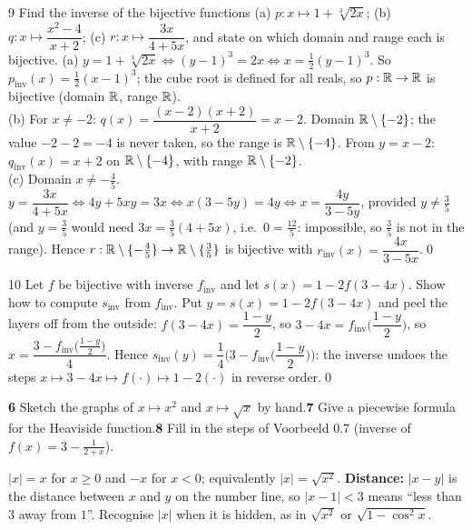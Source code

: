 \begin{bookex}{9}
Find the inverse of the bijective functions (a) $p:x\mapsto1+\sqrt[3]{2x}$; (b) $q:x\mapsto\dfrac{x^2-4}{x+2}$; (c) $r:x\mapsto\dfrac{3x}{4+5x}$, and state on which domain and range each is bijective.
\solution
(a) $y=1+\sqrt[3]{2x}\Leftrightarrow(y-1)^3=2x\Leftrightarrow x=\tfrac12(y-1)^3$. So $p_{\mathrm{inv}}(x)=\tfrac12(x-1)^3$; the cube root is defined for all reals, so $p:\mathbb{R}\to\mathbb{R}$ is bijective (domain $\mathbb{R}$, range $\mathbb{R}$).\\
(b) For $x\ne-2$: $q(x)=\dfrac{(x-2)(x+2)}{x+2}=x-2$. Domain $\mathbb{R}\setminus\{-2\}$; the value $-2-2=-4$ is never taken, so the range is $\mathbb{R}\setminus\{-4\}$. From $y=x-2$: $q_{\mathrm{inv}}(x)=x+2$ on $\mathbb{R}\setminus\{-4\}$, with range $\mathbb{R}\setminus\{-2\}$.\\
(c) Domain $x\ne-\frac45$. $y=\dfrac{3x}{4+5x}\Leftrightarrow4y+5xy=3x\Leftrightarrow x(3-5y)=4y\Leftrightarrow x=\dfrac{4y}{3-5y}$, provided $y\ne\frac35$ (and $y=\frac35$ would need $3x=\frac35(4+5x)$, i.e.\ $0=\frac{12}5$: impossible, so $\frac35$ is not in the range). Hence $r:\mathbb{R}\setminus\{-\frac45\}\to\mathbb{R}\setminus\{\frac35\}$ is bijective with $r_{\mathrm{inv}}(x)=\dfrac{4x}{3-5x}$.\qed
\end{bookex}

\begin{bookex}{10}
Let $f$ be bijective with inverse $f_{\mathrm{inv}}$ and let $s(x)=1-2f(3-4x)$. Show how to compute $s_{\mathrm{inv}}$ from $f_{\mathrm{inv}}$.
\solution
Put $y=s(x)=1-2f(3-4x)$ and peel the layers off from the outside: $f(3-4x)=\dfrac{1-y}2$, so $3-4x=f_{\mathrm{inv}}\!\Big(\dfrac{1-y}2\Big)$, so $x=\dfrac{3-f_{\mathrm{inv}}\big(\frac{1-y}2\big)}4$. Hence $s_{\mathrm{inv}}(y)=\dfrac14\Big(3-f_{\mathrm{inv}}\Big(\dfrac{1-y}2\Big)\Big)$: the inverse undoes the steps $x\mapsto3-4x\mapsto f(\cdot)\mapsto1-2(\cdot)$ in reverse order.\qed
\end{bookex}

\begin{trybox}[{6, 7, 8}]
\textbf{6} Sketch the graphs of $x\mapsto x^2$ and $x\mapsto\sqrt x$ by hand.\quad \textbf{7} Give a piecewise formula for the Heaviside function.\quad \textbf{8} Fill in the steps of Voorbeeld 0.7 (inverse of $f(x)=3-\frac1{2+x}$).
\end{trybox}

\begin{key}[{\S0.2.1}]
$|x|=x$ for $x\ge0$ and $-x$ for $x<0$; equivalently $|x|=\sqrt{x^2}$. \textbf{Distance:} $|x-y|$ is the distance between $x$ and $y$ on the number line, so $|x-1|<3$ means ``less than $3$ away from $1$''. Recognise $|x|$ when it is hidden, as in $\sqrt{x^2}$ or $\sqrt{1-\cos^2x}$.
\end{key}

